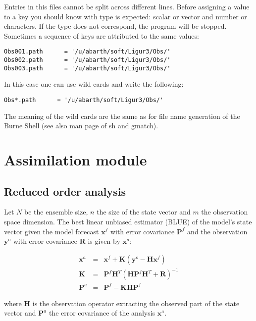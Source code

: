 \documentclass[a4paper,12pt]{article}
\begin{document}
Entries in this files cannot be split across different lines. Before
assigning a value to a key you should know with type is expected:
scalar or vector and number or characters. If the type does not
correspond, the program will be stopped. \\

Sometimes a sequence of keys are attributed to the same values:

\begin{verbatim}
Obs001.path      = '/u/abarth/soft/Ligur3/Obs/' 
Obs002.path      = '/u/abarth/soft/Ligur3/Obs/' 
Obs003.path      = '/u/abarth/soft/Ligur3/Obs/' 
\end{verbatim} 

In this case one can use wild cards and write the following:

\begin{verbatim}
Obs*.path      = '/u/abarth/soft/Ligur3/Obs/' 
\end{verbatim} 

The meaning of the wild cards are the same as for file name generation of the
Burne Shell (see also man page of sh and gmatch).  

\section{Assimilation module}

\subsection{Reduced order analysis}

Let $N$ be the ensemble size, $n$ the size of the state vector and $m$ the observation space dimension. The best linear unbiased estimator (BLUE) of the model's state vector
given the model forecast $\mathbf x^f$ with error covariance $\mathbf
P^f$ and the observation $\mathbf y^o$ with error covariance $\mathbf
R$ is given by $\mathbf x^a$:

\begin{eqnarray}
\mathbf x^a &=& \mathbf x^f + \mathbf K 
\left(\mathbf y^o - \mathbf H \mathbf x^f \right) \\
\mathbf{K} &=& \mathbf P^f \mathbf H^T 
\left( \mathbf H \mathbf P^f \mathbf H^T + \mathbf R \right)^{-1} 
\label{KPf} \\
\mathbf P^a &=&
\mathbf P^f - \mathbf K \mathbf H \mathbf P^f \label{PaPf}
\end{eqnarray}

where $\mathbf H$ is the observation operator extracting the observed
part of the state vector and $\mathbf P^a$ the error covariance of the
analysis $\mathbf x^a$. 
\end{document}
